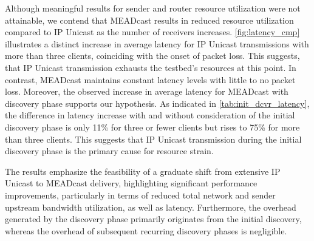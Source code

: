 \begin{itemize}
    Although meaningful results for sender and router resource utilization were
        not attainable, we contend that MEADcast results in reduced resource
        utilization compared to IP Unicast as the number of receivers
        increases.
    \autoref{fig:latency_cmp} illustrates a distinct increase in average
        latency for IP Unicast transmissions with more than three clients,
        coinciding with the onset of packet loss.
    This suggests, that IP Unicast transmission exhausts the testbed's
        resources at this point.
    In contrast, MEADcast maintains constant latency levels with little to no
        packet loss.
    Moreover, the observed increase in average latency for MEADcast with
        discovery phase supports our hypothesis.
    As indicated in \autoref{tab:init_dcvr_latency}, the difference in latency
        increase with and without consideration of the initial discovery phase
        is only 11\% for three or fewer clients but rises to 75\% for more than
        three clients.
    This suggests that IP Unicast transmission during the initial discovery
        phase is the primary cause for resource strain.

    The results emphasize the feasibility of a graduate shift from extensive
        IP Unicast to MEADcast delivery, highlighting significant performance
        improvements, particularly in terms of reduced total network and sender
        upstream bandwidth utilization, as well as latency.
    Furthermore, the overhead generated by the discovery phase primarily
        originates from the initial discovery, whereas the overhead of
        subsequent recurring discovery phases is negligible.
\end{itemize}

